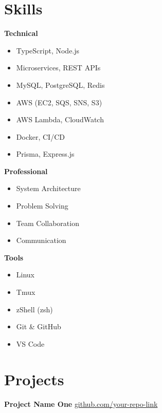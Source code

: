 \section*{Skills}
\begin{flushleft}
\begin{minipage}[t]{0.33\textwidth}
    \large\textbf{Technical}
    \begin{itemize}
        \item TypeScript, Node.js
        \item Microservices, REST APIs
        \item MySQL, PostgreSQL, Redis
        \item AWS (EC2, SQS, SNS, S3)
        \item AWS Lambda, CloudWatch
        \item Docker, CI/CD
        \item Prisma, Express.js
    \end{itemize}
\end{minipage}%
\begin{minipage}[t]{0.33\textwidth}
    \large\textbf{Professional}
    \begin{itemize}
        \item System Architecture
        \item Problem Solving
        \item Team Collaboration
        \item Communication
    \end{itemize}
\end{minipage}%
\begin{minipage}[t]{0.33\textwidth}
    \large\textbf{Tools}
    \begin{itemize}
        \item Linux
        \item Tmux
        \item zShell (zsh)
        \item Git \& GitHub
        \item VS Code
    \end{itemize}
\end{minipage}
\end{flushleft}

\section*{Projects}

\textbf{Project Name One} \hfill \href{https://github.com/your-repo-link}{github.com/your-repo-link}
\vspace{0.5ex}


